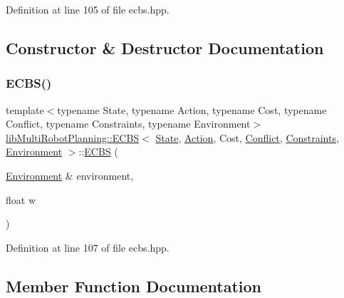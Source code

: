 Definition at line 105 of file ecbs.\+hpp.



\subsection{Constructor \& Destructor Documentation}
\mbox{\label{classlib_multi_robot_planning_1_1_e_c_b_s_acfa9763a8d2a9bbf76736343e266a419}} 
\subsubsection{\texorpdfstring{E\+C\+B\+S()}{ECBS()}}
{\footnotesize\ttfamily template$<$typename State, typename Action, typename Cost, typename Conflict, typename Constraints, typename Environment$>$ \\
\hyperlink{classlib_multi_robot_planning_1_1_e_c_b_s}{lib\+Multi\+Robot\+Planning\+::\+E\+C\+BS}$<$ \hyperlink{structlib_multi_robot_planning_1_1_state}{State}, \hyperlink{namespacelib_multi_robot_planning_aba73fb71693f86a324adfa0e41e1053d}{Action}, Cost, \hyperlink{structlib_multi_robot_planning_1_1_conflict}{Conflict}, \hyperlink{structlib_multi_robot_planning_1_1_constraints}{Constraints}, \hyperlink{classlib_multi_robot_planning_1_1_environment}{Environment} $>$\+::\hyperlink{classlib_multi_robot_planning_1_1_e_c_b_s}{E\+C\+BS} (\begin{DoxyParamCaption}\item[{\hyperlink{classlib_multi_robot_planning_1_1_environment}{Environment} \&}]{environment,  }\item[{float}]{w }\end{DoxyParamCaption})\hspace{0.3cm}{\ttfamily [inline]}}



Definition at line 107 of file ecbs.\+hpp.



\subsection{Member Function Documentation}
\mbox{\label{classlib_multi_robot_planning_1_1_e_c_b_s_afecd0fb22e9070ee79391a6850c15f3d}} 
